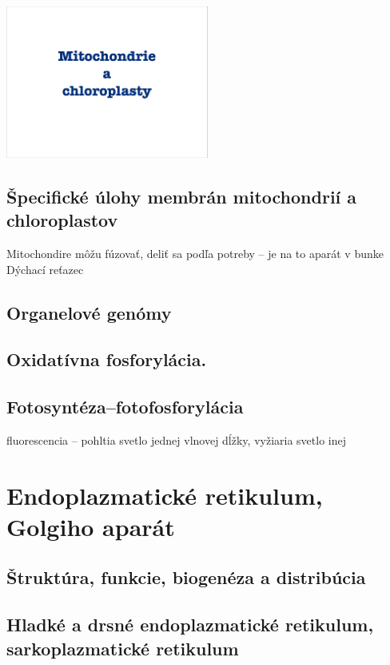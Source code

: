 \includegraphics[width=0.5\textwidth, page=5]{materials/Bunkova_biologia/prednasky_zaklady_bunkovej_biologie/08_ZBB08-Mitochondrieachloroplasty.pdf}

\subsection{Špecifické úlohy membrán mitochondrií a chloroplastov}
Mitochondire môžu fúzovať, deliť sa podľa potreby -- je na to aparát v bunke\\
Dýchací reťazec\\

\subsection{Organelové genómy}

\subsection{Oxidatívna fosforylácia.}

\subsection{Fotosyntéza--fotofosforylácia}
fluorescencia -- pohltia svetlo jednej vlnovej dĺžky, vyžiaria svetlo inej\\

\section{Endoplazmatické retikulum, Golgiho aparát}

\subsection{Štruktúra, funkcie, biogenéza a distribúcia}

\subsection{Hladké a drsné endoplazmatické retikulum, sarkoplazmatické retikulum}

